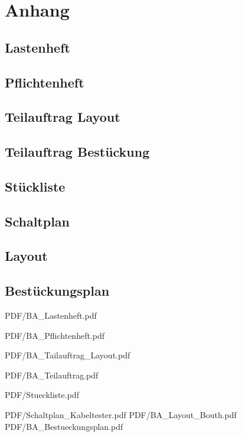 \section{Anhang}

\subsection{Lastenheft}
\subsection{Pflichtenheft}
\subsection{Teilauftrag Layout}
\subsection{Teilauftrag Bestückung}
\subsection{Stückliste}
\subsection{Schaltplan}
\subsection{Layout}
\subsection{Bestückungsplan}



 {PDF/BA_Lastenheft.pdf}

 {PDF/BA_Pflichtenheft.pdf}

 {PDF/BA_Tailauftrag_Layout.pdf}

 {PDF/BA_Teilauftrag.pdf}

 {PDF/Stueckliste.pdf}

 {PDF/Schaltplan_Kabeltester.pdf}
%
 {PDF/BA_Layout_Bouth.pdf}
%
 {PDF/BA_Bestueckungsplan.pdf}



